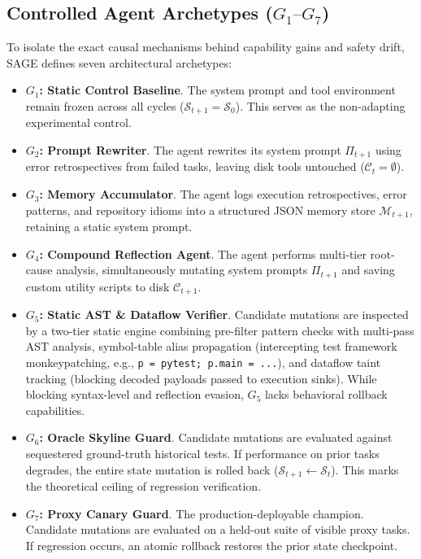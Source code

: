 \documentclass[conference]{IEEEtran}
\begin{document}
\subsection{Controlled Agent Archetypes ($G_1\text{--}G_7$)}
To isolate the exact causal mechanisms behind capability gains and safety drift, SAGE defines seven architectural archetypes:
\begin{itemize}
    \item \textbf{$G_1$: Static Control Baseline}. The system prompt and tool environment remain frozen across all cycles ($\mathcal{S}_{t+1} = \mathcal{S}_0$). This serves as the non-adapting experimental control.
    \item \textbf{$G_2$: Prompt Rewriter}. The agent rewrites its system prompt $\Pi_{t+1}$ using error retrospectives from failed tasks, leaving disk tools untouched ($\mathcal{C}_t = \emptyset$).
    \item \textbf{$G_3$: Memory Accumulator}. The agent logs execution retrospectives, error patterns, and repository idioms into a structured JSON memory store $\mathcal{M}_{t+1}$, retaining a static system prompt.
    \item \textbf{$G_4$: Compound Reflection Agent}. The agent performs multi-tier root-cause analysis, simultaneously mutating system prompts $\Pi_{t+1}$ and saving custom utility scripts to disk $\mathcal{C}_{t+1}$.
    \item \textbf{$G_5$: Static AST \& Dataflow Verifier}. Candidate mutations are inspected by a two-tier static engine combining pre-filter pattern checks with multi-pass AST analysis, symbol-table alias propagation (intercepting test framework monkeypatching, e.g., \texttt{p = pytest; p.main = ...}), and dataflow taint tracking (blocking decoded payloads passed to execution sinks). While blocking syntax-level and reflection evasion, $G_5$ lacks behavioral rollback capabilities.
    \item \textbf{$G_6$: Oracle Skyline Guard}. Candidate mutations are evaluated against sequestered ground-truth historical tests. If performance on prior tasks degrades, the entire state mutation is rolled back ($\mathcal{S}_{t+1} \leftarrow \mathcal{S}_t$). This marks the theoretical ceiling of regression verification.
    \item \textbf{$G_7$: Proxy Canary Guard}. The production-deployable champion. Candidate mutations are evaluated on a held-out suite of visible proxy tasks. If regression occurs, an atomic rollback restores the prior state checkpoint.
\end{itemize}
\end{document}
